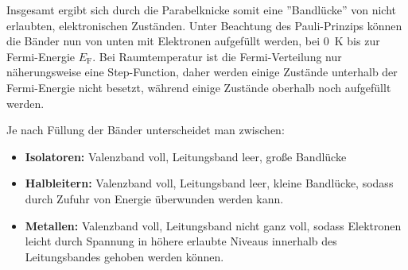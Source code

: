 Insgesamt ergibt sich durch die Parabelknicke somit eine ''Bandlücke'' von nicht erlaubten, elektronischen Zuständen.
Unter Beachtung des Pauli-Prinzips können die Bänder nun von unten mit Elektronen aufgefüllt werden, bei \SI{0}{\kelvin} bis zur Fermi-Energie $E_\text{F}$.
Bei Raumtemperatur ist die Fermi-Verteilung nur näherungsweise eine Step-Function, daher werden einige Zustände unterhalb der Fermi-Energie nicht besetzt, während einige Zustände oberhalb noch aufgefüllt werden.

Je nach Füllung der Bänder unterscheidet man zwischen:
\begin{itemize}
	\item \textbf{Isolatoren:} Valenzband voll, Leitungsband leer, große Bandlücke
	\item \textbf{Halbleitern:} Valenzband voll, Leitungsband leer, kleine Bandlücke, sodass durch Zufuhr von Energie überwunden werden kann.
	\item \textbf{Metallen:} Valenzband voll, Leitungsband nicht ganz voll, sodass Elektronen leicht durch Spannung in höhere erlaubte Niveaus innerhalb des Leitungsbandes gehoben werden können.
\end{itemize}
